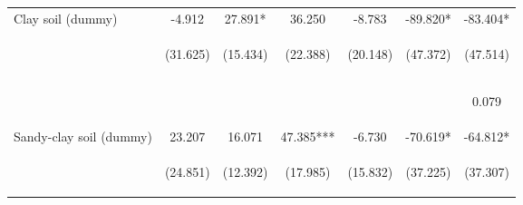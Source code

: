 \begin{center}
\begin{tabular}{lcccccc}
Clay soil (dummy) & -4.912 & 27.891* & 36.250 & -8.783 & -89.820* & -83.404* \\
 & \begin{footnotesize}(31.625)\end{footnotesize} & \begin{footnotesize}(15.434)\end{footnotesize} & \begin{footnotesize}(22.388)\end{footnotesize} & \begin{footnotesize}(20.148)\end{footnotesize} & \begin{footnotesize}(47.372)\end{footnotesize} & \begin{footnotesize}(47.514)\end{footnotesize} \\
\vspace{4pt} & \begin{footnotesize}[0.877]\end{footnotesize} & \begin{footnotesize}[0.071]\end{footnotesize} & \begin{footnotesize}[0.105]\end{footnotesize} & \begin{footnotesize}[0.663]\end{footnotesize} & \begin{footnotesize}[0.058]\end{footnotesize} & \begin{footnotesize}0.079\end{footnotesize} \\
Sandy-clay soil (dummy) & 23.207 & 16.071 & 47.385*** & -6.730 & -70.619* & -64.812* \\
 & \begin{footnotesize}(24.851)\end{footnotesize} & \begin{footnotesize}(12.392)\end{footnotesize} & \begin{footnotesize}(17.985)\end{footnotesize} & \begin{footnotesize}(15.832)\end{footnotesize} & \begin{footnotesize}(37.225)\end{footnotesize} & \begin{footnotesize}(37.307)\end{footnotesize} \\

\end{tabular}
\end{center}
